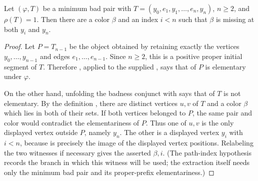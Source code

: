 \begin{helper}
Let \((\varphi,T)\) be a minimum bad pair with
\(T=(y_0,e_1,y_1,\ldots,e_n,y_n)\), \(n\geq2\), and \(\rho(T)=1\).
Then there are a color \(\beta\) and an index \(i<n\) such that
\(\beta\) is missing at both \(y_i\) and \(y_n\).
\end{helper}
\begin{proof}
Let \(P=T_{n-1}\) be the object  obtained by
retaining exactly the vertices \(y_0,\ldots,y_{n-1}\) and edges
\(e_1,\ldots,e_{n-1}\).  Since \(n\geq2\), this is a positive proper
initial segment of \(T\).  Therefore
, applied to the supplied
, says that
 of \(P\) is elementary under
\(\varphi\).

On the other hand, unfolding the badness conjunct with
 says that
 of \(T\) is not elementary.  By the
definition , there are distinct
vertices \(u,v\) of \(T\) and a color \(\beta\) which lies in both of
their  sets.  If both vertices belonged to \(P\),
the same pair and color would contradict the elementariness of \(P\).
Thus one of \(u,v\) is the only displayed vertex outside \(P\), namely
\(y_n\).  The other is a displayed vertex \(y_i\) with \(i<n\), because
 is precisely the image of the displayed
vertex positions.  Relabeling the two witnesses if necessary gives the
asserted \(\beta,i\).  (The path-index hypothesis records the branch in
which this witness will be used; the extraction itself needs only the
minimum bad pair and its proper-prefix elementariness.)
\end{proof}
